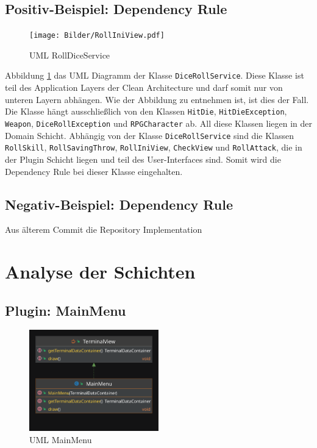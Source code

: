 \subsection{Positiv-Beispiel: Dependency Rule}
\begin{figure}[H]
	\centering
	\texttt{[image: Bilder/RollIniView.pdf]}
	\caption{UML RollDiceService}
	\label{fig:RollDiceServiceDependencys}
\end{figure}
Abbildung \ref{fig:RollDiceServiceDependencys} das UML Diagramm der Klasse \texttt{DiceRollService}. Diese Klasse ist teil des Application Layers der Clean Architecture und darf somit nur von unteren Layern abhängen. Wie der Abbildung zu entnehmen ist, ist dies der Fall. Die Klasse hängt ausschließlich von den Klassen \texttt{HitDie}, \texttt{HitDieException}, \texttt{Weapon}, \texttt{DiceRollException} und \texttt{RPGCharacter} ab. All diese Klassen liegen in der Domain Schicht. Abhängig von der Klasse \texttt{DiceRollService} sind die Klassen \texttt{RollSkill}, \texttt{RollSavingThrow}, \texttt{RollIniView}, \texttt{CheckView} und \texttt{RollAttack}, die in der Plugin Schicht liegen und teil des User-Interfaces sind. Somit wird die Dependency Rule bei dieser Klasse eingehalten.


\subsection{Negativ-Beispiel: Dependency Rule}
Aus älterem Commit die Repository Implementation

\section{Analyse der Schichten}

\subsection{Plugin: MainMenu}
\begin{figure}[H]
	\centering
	\includegraphics[width=0.5\textwidth]{Bilder/MainMenu.pdf}
	\caption{UML MainMenu}
	\label{fig:MainMenu}
\end{figure}

